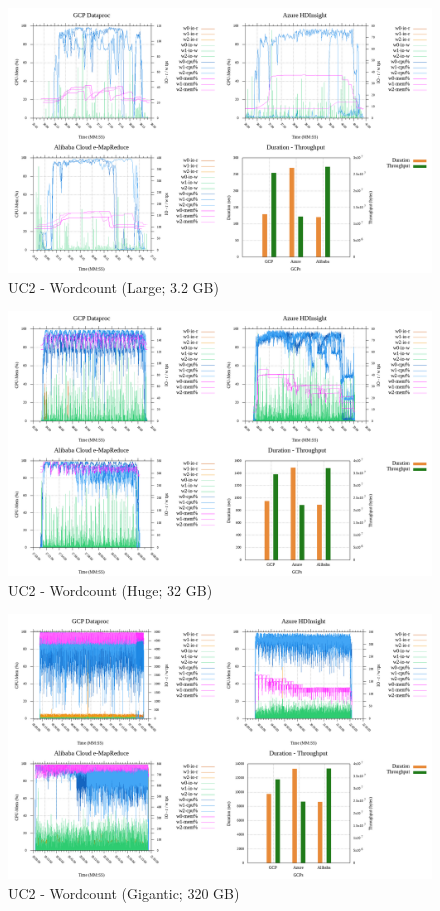 \documentclass[review]{elsarticle}
\begin{document}
\begin{figure}[p]
	\includegraphics[width=\textwidth]{uc2-wrdcnt-l-cmidt}
	\caption{UC2 - Wordcount (Large; 3.2 GB)}
	\label{fig:uc2-wrdcnt-l-cmidt}
	\centering
\end{figure}

\begin{figure}[p]
	\includegraphics[width=\textwidth]{uc2-wrdcnt-h-cmidt}
	\caption{UC2 - Wordcount (Huge; 32 GB)}
	\label{fig:uc2-wrdcnt-h-cmidt}
	\centering
\end{figure}

\begin{figure}[p]
	\includegraphics[width=\textwidth]{uc2-wrdcnt-g-cmidt}
	\caption{UC2 - Wordcount (Gigantic; 320 GB)}
	\label{fig:uc2-wrdcnt-g-cmidt}
	\centering
\end{figure}
\end{document}
